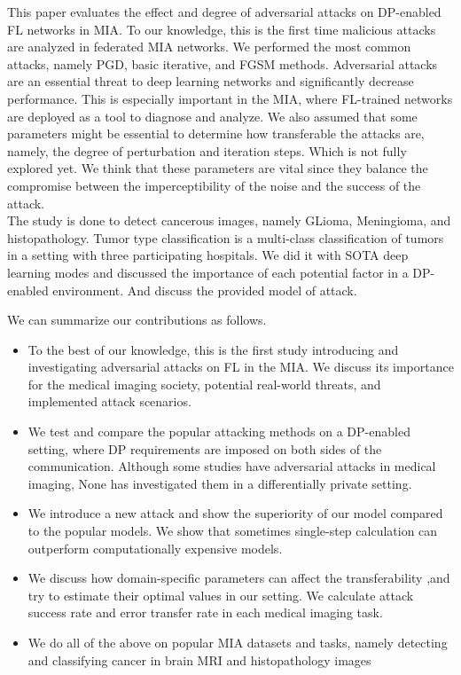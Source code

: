 This paper evaluates the effect and degree of adversarial attacks on DP-enabled FL networks in MIA. To our knowledge, this is the first time malicious attacks are analyzed in federated MIA networks. We performed the most common attacks, namely PGD, basic iterative, and FGSM methods. Adversarial attacks are an essential threat to deep learning networks and significantly decrease performance. This is especially important in the MIA, where FL-trained networks are deployed as a tool to diagnose and analyze. We also assumed that some parameters might be essential to determine how transferable the attacks are, namely, the degree of perturbation and iteration steps. Which is not fully explored yet. We think that these parameters are vital since they balance the compromise between the imperceptibility of the noise and the success of the attack.\\ The study is done to detect cancerous images, namely GLioma, Meningioma, and histopathology. Tumor type classification is a multi-class classification of tumors in a setting with three participating hospitals. We did it with SOTA deep learning modes and discussed the importance of each potential factor in a DP-enabled environment. And discuss the provided model of attack.



We can summarize our contributions as follows.

\begin{itemize}
  \item To the best of our knowledge, this is the first study introducing and investigating adversarial attacks on FL in the MIA. We discuss its importance for the medical imaging society, potential real-world threats, and implemented attack scenarios.

\item We test and compare the popular attacking methods on a DP-enabled setting, where DP requirements are imposed on both sides of the communication. Although some studies have adversarial attacks in medical imaging, None has investigated them in a differentially private setting.

  \item  We introduce a new attack and show the superiority of our model compared to the popular models. We show that sometimes single-step calculation can outperform computationally expensive models.
    \item We discuss how domain-specific parameters can affect the transferability ,and try to estimate their optimal values in our setting. We calculate attack success rate and error transfer rate in each medical imaging task.
  \item We do all of the above on popular MIA datasets and tasks, namely detecting and classifying cancer in brain MRI and histopathology images
  
\end{itemize}


